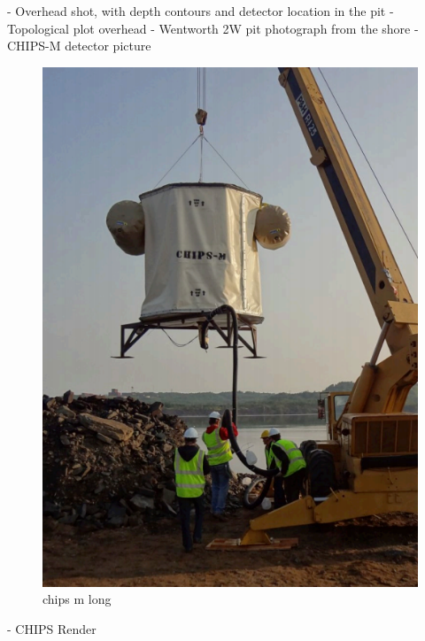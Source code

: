 - Overhead shot, with depth contours and detector location in the pit
- Topological plot overhead
- Wentworth 2W pit photograph from the shore
- CHIPS-M detector picture
\begin{figure}
    \includegraphics[width=\textwidth]{diagrams/4-chips/chips_m.png}
    \caption[chips m short]{chips m long}
    \label{fig:chips_m}
\end{figure}
- CHIPS Render
